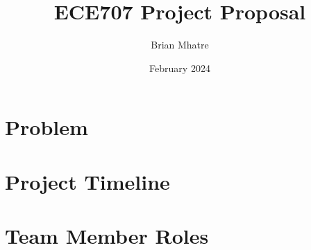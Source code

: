 \documentclass{article}
\title{ECE707 Project Proposal}
\author{Brian Mhatre}
\date{February 2024}
\begin{document}
\maketitle

\section{Problem}
\section{Project Timeline}
\section{Team Member Roles}
\end{document}
